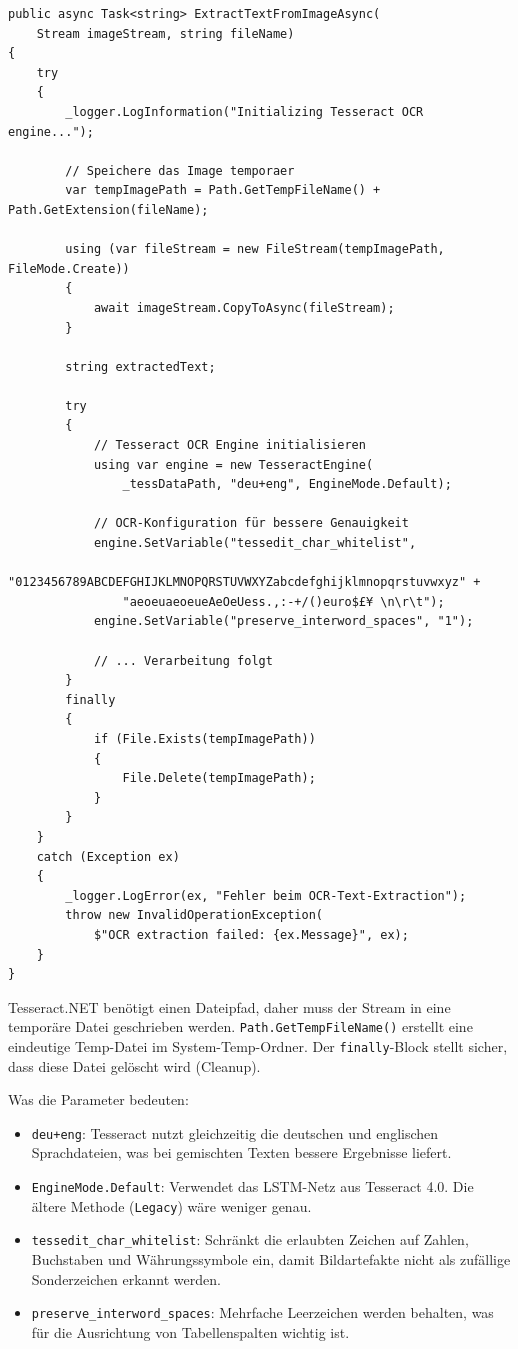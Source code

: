 \begin{lstlisting}[language={[Sharp]C}, caption={Tesseract Engine Setup}, label={lst:tesseract_init}]
public async Task<string> ExtractTextFromImageAsync(
    Stream imageStream, string fileName)
{
    try
    {
        _logger.LogInformation("Initializing Tesseract OCR engine...");

        // Speichere das Image temporaer
        var tempImagePath = Path.GetTempFileName() + Path.GetExtension(fileName);
        
        using (var fileStream = new FileStream(tempImagePath, FileMode.Create))
        {
            await imageStream.CopyToAsync(fileStream);
        }

        string extractedText;

        try
        {
            // Tesseract OCR Engine initialisieren
            using var engine = new TesseractEngine(
                _tessDataPath, "deu+eng", EngineMode.Default);
            
            // OCR-Konfiguration für bessere Genauigkeit
            engine.SetVariable("tessedit_char_whitelist", 
                "0123456789ABCDEFGHIJKLMNOPQRSTUVWXYZabcdefghijklmnopqrstuvwxyz" +
                "aeoeuaeoeueAeOeUess.,:-+/()euro$£¥ \n\r\t");
            engine.SetVariable("preserve_interword_spaces", "1");
            
            // ... Verarbeitung folgt
        }
        finally
        {
            if (File.Exists(tempImagePath))
            {
                File.Delete(tempImagePath);
            }
        }
    }
    catch (Exception ex)
    {
        _logger.LogError(ex, "Fehler beim OCR-Text-Extraction");
        throw new InvalidOperationException(
            $"OCR extraction failed: {ex.Message}", ex);
    }
}
\end{lstlisting}

Tesseract.NET benötigt einen Dateipfad, daher muss der Stream in eine temporäre Datei geschrieben werden. \texttt{Path.GetTempFileName()} erstellt eine eindeutige Temp-Datei im System-Temp-Ordner. Der \texttt{finally}-Block stellt sicher, dass diese Datei gelöscht wird (Cleanup).

Was die Parameter bedeuten:
\begin{itemize}
    \item \texttt{deu+eng}: Tesseract nutzt gleichzeitig die deutschen und englischen Sprachdateien, was bei gemischten Texten bessere Ergebnisse liefert.
    \item \texttt{EngineMode.Default}: Verwendet das LSTM-Netz aus Tesseract 4.0. Die ältere Methode (\texttt{Legacy}) wäre weniger genau.
    \item \texttt{tessedit\_char\_whitelist}: Schränkt die erlaubten Zeichen auf Zahlen, Buchstaben und Währungssymbole ein, damit Bildartefakte nicht als zufällige Sonderzeichen erkannt werden.
    \item \texttt{preserve\_interword\_spaces}: Mehrfache Leerzeichen werden behalten, was für die Ausrichtung von Tabellenspalten wichtig ist.
\end{itemize}

